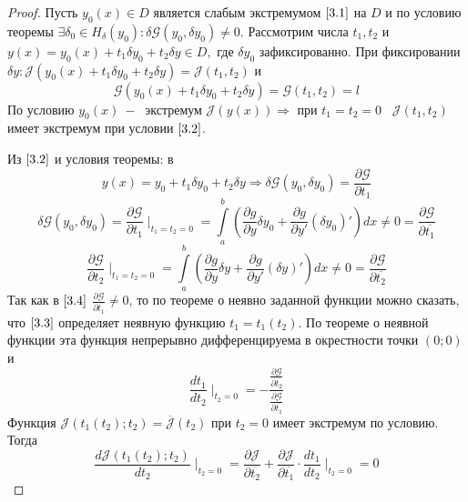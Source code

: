 \documentclass{article}
\begin{document}
\begin{proof}
Пусть $y_0(x)\in D$ является слабым экстремумом $\ref{3.1}$ на $D$ и по условию теоремы $\exists \delta_0\in H_\delta(y_0): \delta\mathcal{G}(y_0,\delta y_0)\neq 0$. Рассмотрим числа $t_1, t_2$ и $y(x)=y_0(x)+t_1\delta y_0 + t_2 \delta y \in D,$ где $\delta y_0$ зафиксированно. При фиксировании $\delta y: \mathcal{J}(y_0(x)+t_1\delta y_0+t_2 \delta y)=\mathcal{J}(t_1,t_2)$ и \begin{equation}
    \label{3.3}
    \tag{3.3}
    \mathcal{G}(y_0(x)+t_1\delta y_0+t_2 \delta y)=\mathcal{G}(t_1,t_2)=l
\end{equation}
По условию $y_0(x)~-~$ экстремум $\mathcal{J}(y(x))\Rightarrow$ при $t_1=t_2=0\;\;\;\mathcal{J}(t_1,t_2)$ имеет экстремум при условии $\ref{3.2}$.\par
Из $\ref{3.2}$ и условия теоремы: в $$y(x)=y_0+t_1\delta y_0+t_2\delta y\Rightarrow \delta \mathcal{G}(y_0,\delta y_0)=\frac{\partial \mathcal{G}}{\partial t_1}$$$$\delta \mathcal{G}(y_0,\delta y_0)=\frac{\partial \mathcal{G}}{\partial t_1}\mid_{t_1=t_2=0}=\int\limits_a^b(\frac{\partial g}{\partial y}\delta y_0+\frac{\partial g}{\partial y'}(\delta y_0)')dx\neq0=\frac{\partial \mathcal{G}}{\partial\overline{t_1}}$$
\begin{equation}
\frac{\partial \mathcal{G}}{\partial t_2}\mid_{t_1=t_2=0}=\int\limits_a^b(\frac{\partial g}{\partial y}\delta y+\frac{\partial g}{\partial y'}(\delta y)')dx\neq0=\frac{\partial \mathcal{G}}{\partial\overline{t_2}}
\label{3.4}\tag{3.4}
\end{equation}
Так как в $\ref{3.4}$ $\frac{\partial \mathcal{G}}{\partial \overline{t_1}}\neq 0$, то по теореме о неявно заданной функции можно сказать, что $\ref{3.3}$ определяет неявную функцию $t_1=t_1(t_2)$. По теореме о неявной функции эта функция непрерывно дифференцируема в окрестности точки $(0;0)$ и \begin{equation}
    \frac{dt_1}{dt_2}\mid_{t_2=0}=-\frac{\frac{\partial \mathcal{G}}{\partial \overline{t_2}}}{\frac{\partial \mathcal{G}}{\partial \overline{t_1}}}
    \label{3.5}
    \tag{3.5}
    \end{equation}
Функция $\mathcal{J}(t_1(t_2);t_2)=\overline{\mathcal{J}}(t_2)$ при $t_2=0$ имеет экстремум по условию. Тогда \begin{equation}
    \frac{d\mathcal{J}(t_1(t_2);t_2)}{dt_2}\mid_{t_2=0}=\frac{\partial \mathcal{J}}{\partial \overline{t_2}}+ \frac{\partial \mathcal{J}}{\partial \overline{t_1}}\cdot \frac{d t_1}{d t_2}\mid_{t_2=0}=0
    \tag{3.6}
    \label{3.6}
    \end{equation}

\end{proof}
\end{document}
